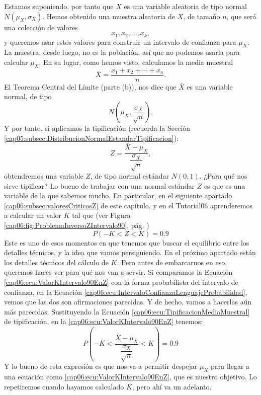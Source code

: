 Estamos suponiendo, por tanto que $X$ es una variable aleatoria de tipo normal
$N(\mu_X,\sigma_X)$. Hemos obtenido una muestra aleatoria de $X$, de tamaño
$n$, que será una colección de valores
\[x_1,x_2,\ldots,x_k,\]
y queremos usar estos valores para construir un intervalo de confianza para
$\mu_X$. La muestra, desde luego, no es la población, así que no podemos usarla
para calcular $\mu_X$. En su lugar, como hemos visto, calculamos la media
muestral
\[\bar X=\dfrac{x_1+x_2+\cdots+x_n}{n}.\]
El Teorema Central del Límite (parte (b)), nos dice que $\bar X$ es una
variable normal, de tipo  \[N\left(\mu_X,\dfrac{\sigma_X}{\sqrt{n}}\right).\] Y
por tanto, si aplicamos la tipificación (recuerda la Sección \ref{cap05:subsec:DistribucionNormalEstandarTipificacion}):
    \begin{equation}\label{cap06:ecu:TipificacionMediaMuestral}
    Z=\dfrac{\bar X-\mu_X}{\dfrac{\sigma_X}{\sqrt{n}}},
    \end{equation}
obtendremos una variable $Z$, de tipo normal estándar $N(0,1)$. ¿Para qué nos
sirve tipificar? Lo bueno de trabajar con una normal estándar $Z$ es que es una
variable de la que sabemos mucho. En particular, en el siguiente apartado
\ref{cap06:subsec:valoresCriticosZ}
 de este capítulo, y en el Tutorial06 aprenderemos a calcular un valor $K$ tal que (ver Figura \ref{cap06:fig:ProblemaInversoZIntervalo90}, pág. \pageref{cap06:fig:ProblemaInversoZIntervalo90})
\begin{equation}\label{cap06:ecu:ValorKIntervalo90EnZ}
P(-K< Z <K)=0.9
\end{equation}
Este es uno de esos momentos en que tenemos que buscar el equilibrio entre los
detalles técnicos, y la idea que vamos persiguiendo. En el próximo apartado
están los detalles técnicos del cálculo de $K$. Pero antes de embarcarnos en
eso, queremos hacer ver para qué nos van a servir. Si comparamos la Ecuación
\ref{cap06:ecu:ValorKIntervalo90EnZ} con la forma probabilista del intervalo de
confianza, en la Ecuación
\ref{cap06:ecu:IntervaloConfianzaLenguajeProbabilidad}, vemos que las dos son
afirmaciones parecidas. Y de hecho, vamos a hacerlas aún más parecidas.
Sustituyendo la Ecuación \ref{cap06:ecu:TipificacionMediaMuestral} de
tipificación, en la \ref{cap06:ecu:ValorKIntervalo90EnZ} tenemos:
\[
P\left(-K< \dfrac{\bar X-\mu_X}{\dfrac{\sigma_X}{\sqrt{n}}} <K\right)=0.9
\]
Y lo bueno de esta expresión es que nos va a permitir despejar $\mu_X$ para
llegar a una ecuación como \ref{cap06:ecu:ValorKIntervalo90EnZ}, que es nuestro
objetivo. Lo repetiremos cuando hayamos calculado $K$, pero ahí va un adelanto.
